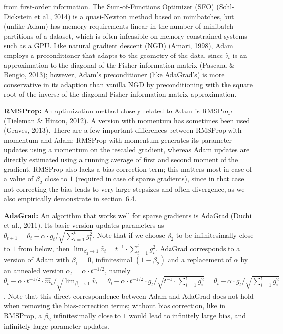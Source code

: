 \documentclass[11pt]{article}
\begin{document}
\noindent
from first-order information. The Sum-of-Functions Optimizer
(SFO) (Sohl-Dickstein et al., 2014) is a quasi-Newton method
based on minibatches, but (unlike Adam) has memory requirements
linear in the number of minibatch partitions of a dataset, which
is often infeasible on memory-constrained systems such as a GPU.
Like natural gradient descent (NGD) (Amari, 1998), Adam employs
a preconditioner that adapts to the geometry of the data, since
$\widehat{v}_t$ is an approximation to the diagonal of the Fisher
information matrix (Pascanu \& Bengio, 2013); however, Adam's
preconditioner (like AdaGrad's) is more conservative in its
adaption than vanilla NGD by preconditioning with the square root
of the inverse of the diagonal Fisher information matrix
approximation.

\vspace{0.5em}

\noindent\textbf{RMSProp:} An optimization method closely related
to Adam is RMSProp (Tieleman \& Hinton, 2012). A version with
momentum has sometimes been used (Graves, 2013). There are a few
important differences between RMSProp with momentum and Adam:
RMSProp with momentum generates its parameter updates using a
momentum on the rescaled gradient, whereas Adam updates are
directly estimated using a running average of first and second
moment of the gradient. RMSProp also lacks a bias-correction
term; this matters most in case of a value of $\beta_2$ close to
$1$ (required in case of sparse gradients), since in that case
not correcting the bias leads to very large stepsizes and often
divergence, as we also empirically demonstrate in section~6.4.

\vspace{0.5em}

\noindent\textbf{AdaGrad:} An algorithm that works well for
sparse gradients is AdaGrad (Duchi et al., 2011). Its basic
version updates parameters as
$\theta_{t+1} = \theta_t - \alpha \cdot g_t / \sqrt{\sum_{i=1}^{t} g_i^2}$.
Note that if we choose $\beta_2$ to be infinitesimally close to
$1$ from below, then
$\lim_{\beta_2 \to 1} \widehat{v}_t = t^{-1} \cdot \sum_{i=1}^{t} g_i^2$.
AdaGrad corresponds to a version of Adam with $\beta_1 = 0$,
infinitesimal $(1 - \beta_2)$ and a replacement of $\alpha$ by an
annealed version $\alpha_t = \alpha \cdot t^{-1/2}$, namely
$\theta_t - \alpha \cdot t^{-1/2} \cdot \widehat{m}_t / \sqrt{\lim_{\beta_2 \to 1} \widehat{v}_t}
 = \theta_t - \alpha \cdot t^{-1/2} \cdot g_t / \sqrt{t^{-1} \cdot \sum_{i=1}^{t} g_i^2}
 = \theta_t - \alpha \cdot g_t / \sqrt{\sum_{i=1}^{t} g_i^2}$.
Note that this direct correspondence between Adam and AdaGrad
does not hold when removing the bias-correction terms; without
bias correction, like in RMSProp, a $\beta_2$ infinitesimally
close to $1$ would lead to infinitely large bias, and infinitely
large parameter updates.
\end{document}
